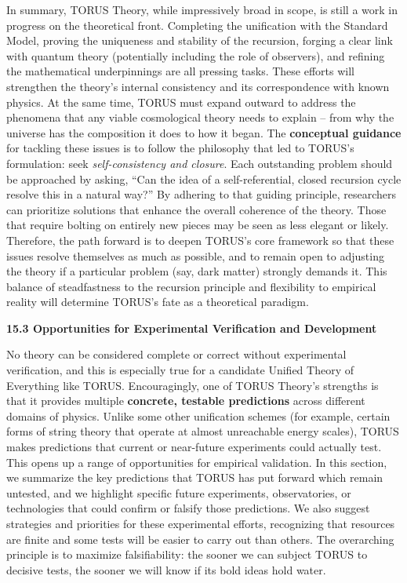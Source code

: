 In summary, TORUS Theory, while impressively broad in scope, is still a
work in progress on the theoretical front. Completing the unification
with the Standard Model, proving the uniqueness and stability of the
recursion, forging a clear link with quantum theory (potentially
including the role of observers), and refining the mathematical
underpinnings are all pressing tasks. These efforts will strengthen the
theory's internal consistency and its correspondence with known physics.
At the same time, TORUS must expand outward to address the phenomena
that any viable cosmological theory needs to explain -- from why the
universe has the composition it does to how it began. The
\textbf{conceptual guidance} for tackling these issues is to follow the
philosophy that led to TORUS's formulation: seek \emph{self-consistency
and closure}. Each outstanding problem should be approached by asking,
``Can the idea of a self-referential, closed recursion cycle resolve
this in a natural way?'' By adhering to that guiding principle,
researchers can prioritize solutions that enhance the overall coherence
of the theory. Those that require bolting on entirely new pieces may be
seen as less elegant or likely. Therefore, the path forward is to deepen
TORUS's core framework so that these issues resolve themselves as much
as possible, and to remain open to adjusting the theory if a particular
problem (say, dark matter) strongly demands it. This balance of
steadfastness to the recursion principle and flexibility to empirical
reality will determine TORUS's fate as a theoretical paradigm.

\textbf{15.3 Opportunities for Experimental Verification and
Development}

No theory can be considered complete or correct without experimental
verification, and this is especially true for a candidate Unified Theory
of Everything like TORUS. Encouragingly, one of TORUS Theory's strengths
is that it provides multiple \textbf{concrete, testable predictions}
across different domains of physics. Unlike some other unification
schemes (for example, certain forms of string theory that operate at
almost unreachable energy scales), TORUS makes predictions that current
or near-future experiments could actually test​. This opens up a range
of opportunities for empirical validation. In this section, we summarize
the key predictions that TORUS has put forward which remain untested,
and we highlight specific future experiments, observatories, or
technologies that could confirm or falsify those predictions. We also
suggest strategies and priorities for these experimental efforts,
recognizing that resources are finite and some tests will be easier to
carry out than others. The overarching principle is to maximize
falsifiability: the sooner we can subject TORUS to decisive tests, the
sooner we will know if its bold ideas hold water.

